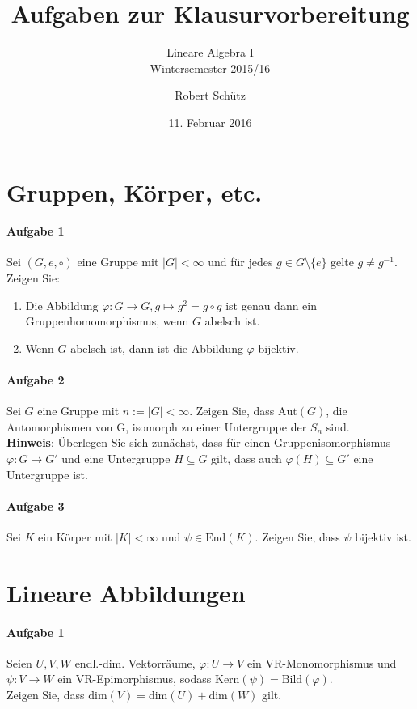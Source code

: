 \documentclass{scrartcl}
\title{Aufgaben zur Klausurvorbereitung}
\subtitle{Lineare Algebra I\\Wintersemester 2015/16}
\author{Robert Schütz}
\date{11. Februar 2016}
\begin{document}
	\pagestyle{scrheadings}
	\maketitle
	\section{Gruppen, Körper, etc.}
	\paragraph{Aufgabe 1}
	Sei $(G,e,\circ)$ eine Gruppe mit $\vert G\vert<\infty$
	und für jedes $g\in G\setminus\{e\}$ gelte $g\neq g^{-1}$.
	Zeigen Sie:
	\begin{enumerate}[label=(\alph*)]
		\item Die Abbildung $\varphi:G\to G, g\mapsto g^2=g\circ g$
			ist genau dann ein Gruppenhomomorphismus, wenn $G$ abelsch ist.
		\item Wenn $G$ abelsch ist, dann ist die Abbildung $\varphi$  bijektiv.
	\end{enumerate}
	\paragraph{Aufgabe 2}
	Sei $G$ eine Gruppe mit $n:=\vert G\vert<\infty$. Zeigen Sie, dass $\text{Aut}(G)$,
	die Automorphismen von G, isomorph zu einer Untergruppe der $S_n$ sind.\\
	\textbf{Hinweis}: Überlegen Sie sich zunächst, dass für einen Gruppenisomorphismus
	$\varphi: G\to G'$ und eine Untergruppe $H\subseteq G$ gilt,
	dass auch $\varphi(H)\subseteq G'$ eine Untergruppe ist.
	\paragraph{Aufgabe 3}
	Sei $K$ ein Körper mit $\vert K\vert<\infty$ und $\psi\in\text{End}(K)$.
	Zeigen Sie, dass $\psi$ bijektiv ist.
	\section{Lineare Abbildungen}
	\paragraph{Aufgabe 1}
	Seien $U, V, W$ endl.-dim. Vektorräume, $\varphi: U\to V$ ein VR-Monomorphismus
	und $\psi: V\to W$ ein VR-Epimorphismus, sodass $\text{Kern}(\psi)=\text{Bild}(\varphi)$.\\
	Zeigen Sie, dass $\text{dim}(V)=\text{dim}(U)+\text{dim}(W)$ gilt.
\end{document}
